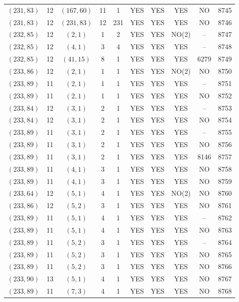 \begin{longtable}{|c|c|c|c|c|c|c|c|c|c|}
$(231, 83)$ & 12 & $(167, 60)$ & 11 & 1 & YES & YES & YES & NO & 8745\\
$(231, 83)$ & 12 & $(231, 83)$ & 12 & 231 & YES & YES & YES & NO & 8746\\
$(232, 85)$ & 12 & $(2, 1)$ & 1 & 2 & YES & YES & NO(2) & -- & 8747\\
$(232, 85)$ & 12 & $(4, 1)$ & 3 & 4 & YES & YES & YES & -- & 8748\\
$(232, 85)$ & 12 & $(41, 15)$ & 8 & 1 & YES & YES & YES & 6279 & 8749\\
$(233, 86)$ & 12 & $(2, 1)$ & 1 & 1 & YES & YES & NO(2) & NO & 8750\\
$(233, 89)$ & 11 & $(2, 1)$ & 1 & 1 & YES & YES & YES & -- & 8751\\
$(233, 89)$ & 11 & $(2, 1)$ & 1 & 1 & YES & YES & YES & NO & 8752\\
$(233, 84)$ & 12 & $(3, 1)$ & 2 & 1 & YES & YES & YES & -- & 8753\\
$(233, 84)$ & 12 & $(3, 1)$ & 2 & 1 & YES & YES & YES & NO & 8754\\
$(233, 89)$ & 11 & $(3, 1)$ & 2 & 1 & YES & YES & YES & -- & 8755\\
$(233, 89)$ & 11 & $(3, 1)$ & 2 & 1 & YES & YES & YES & NO & 8756\\
$(233, 89)$ & 11 & $(3, 1)$ & 2 & 1 & YES & YES & YES & 8146 & 8757\\
$(233, 89)$ & 11 & $(4, 1)$ & 3 & 1 & YES & YES & YES & NO & 8758\\
$(233, 89)$ & 11 & $(4, 1)$ & 3 & 1 & YES & YES & YES & NO & 8759\\
$(233, 64)$ & 12 & $(5, 1)$ & 4 & 1 & YES & YES & NO(2) & NO & 8760\\
$(233, 86)$ & 12 & $(5, 2)$ & 3 & 1 & YES & YES & YES & NO & 8761\\
$(233, 89)$ & 11 & $(5, 1)$ & 4 & 1 & YES & YES & YES & -- & 8762\\
$(233, 89)$ & 11 & $(5, 1)$ & 4 & 1 & YES & YES & YES & NO & 8763\\
$(233, 89)$ & 11 & $(5, 2)$ & 3 & 1 & YES & YES & YES & -- & 8764\\
$(233, 89)$ & 11 & $(5, 2)$ & 3 & 1 & YES & YES & YES & NO & 8765\\
$(233, 89)$ & 11 & $(5, 2)$ & 3 & 1 & YES & YES & YES & NO & 8766\\
$(233, 90)$ & 13 & $(5, 1)$ & 4 & 1 & YES & YES & YES & NO & 8767\\
$(233, 89)$ & 11 & $(7, 3)$ & 4 & 1 & YES & YES & YES & NO & 8768\\

\end{longtable}
